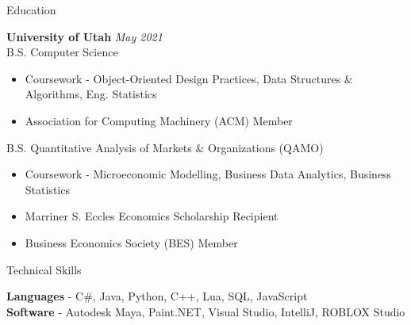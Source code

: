 \documentclass{resume} %
\begin{document}

\begin{rSection}{Education}

{\bf University of Utah} \hfill {\em May 2021}
\\ B.S. Computer Science
\vspace{-6pt}
\begin{itemize}[nosep]
  \item Coursework - Object-Oriented Design Practices, Data Structures \& Algorithms, Eng. Statistics
  \item Association for Computing Machinery (ACM) Member
\end{itemize}

B.S. Quantitative Analysis of Markets \& Organizations (QAMO)
\vspace{-6pt}
\begin{itemize}[nosep]
  \item Coursework - Microeconomic Modelling, Business Data Analytics, Business Statistics
  \item Marriner S. Eccles Economics Scholarship Recipient
  \item Business Economics Society (BES) Member
\end{itemize}

\end{rSection}


\begin{rSection}{Technical Skills}

{\bf Languages} - C\#, Java, Python, C++, Lua, SQL, JavaScript
\\ {\bf Software} - Autodesk Maya, Paint.NET, Visual Studio, IntelliJ, ROBLOX Studio

\end{rSection}
\end{document}
